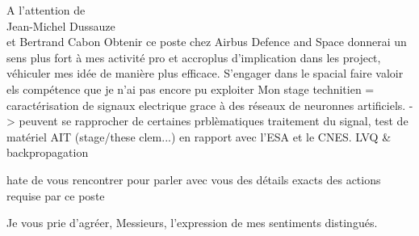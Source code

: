 \documentclass[12pt]{lettre}
\begin{document}
\begin{letter}{A l'attention de\\Jean-Michel Dussauze\\et Bertrand Cabon}
{%
Obtenir ce poste chez Airbus Defence and Space donnerai un sens plus fort
à mes activité pro et accroplus d'implication dans les project, véhiculer mes idée de manière plus efficace. S'engager dans le spacial
faire valoir els compétence que je n'ai pas encore pu exploiter
Mon stage technitien = caractérisation de signaux electrique grace à des réseaux de neuronnes artificiels. -> peuvent se rapprocher de certaines prblèmatiques traitement du signal, test de matériel AIT (stage/these clem...) en rapport avec l'ESA et le CNES. LVQ \& backpropagation
}

hate de vous rencontrer pour parler avec vous des détails exacts des actions requise par ce poste

\closing{Je vous prie d'agréer, Messieurs, l'expression de mes sentiments distingués.}
\end{letter}
\end{document}
